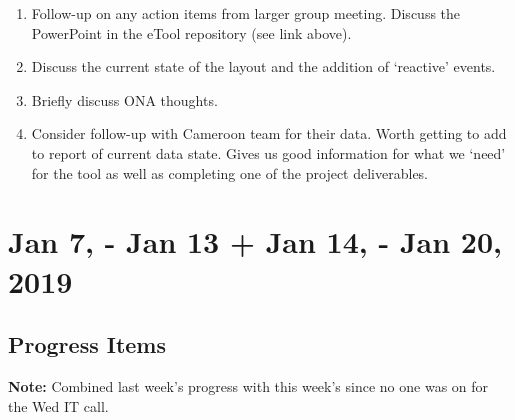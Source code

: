 \documentclass[]{article}
\providecommand{\tightlist}{%
  \setlength{\itemsep}{0pt}\setlength{\parskip}{0pt}}
\begin{document}
\begin{enumerate}
\def\labelenumi{\arabic{enumi}.}
\tightlist
\item
  Follow-up on any action items from larger group meeting. Discuss the
  PowerPoint in the eTool repository (see link above).
\item
  Discuss the current state of the layout and the addition of `reactive'
  events.
\item
  Briefly discuss ONA thoughts.
\item
  Consider follow-up with Cameroon team for their data. Worth getting to
  add to report of current data state. Gives us good information for
  what we `need' for the tool as well as completing one of the project
  deliverables.
\end{enumerate}

\hypertarget{jan-7---jan-13-jan-14---jan-20-2019}{%
\section{Jan 7, - Jan 13 + Jan 14, - Jan 20,
2019}\label{jan-7---jan-13-jan-14---jan-20-2019}}

\hypertarget{progress-items-10}{%
\subsection{Progress Items}\label{progress-items-10}}

\textbf{Note:} Combined last week's progress with this week's since no
one was on for the Wed IT call.
\end{document}
